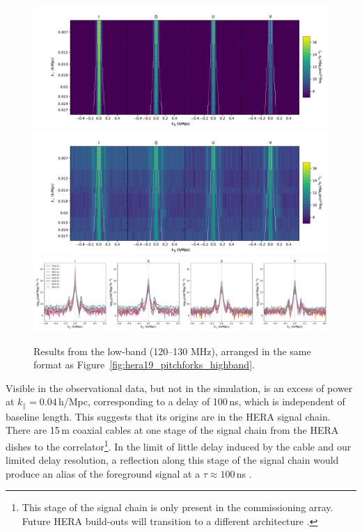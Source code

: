 \begin{figure}[h]
\centering
\includegraphics[scale=0.45]{chapters/eor_window_HERA/figures/timeavg_SIM_low.pdf}
\includegraphics[scale=0.45]{chapters/eor_window_HERA/figures/timeavg_low.pdf}
\includegraphics[scale=0.3]{chapters/eor_window_HERA/figures/timeavg_1d_low.pdf}
\caption[Power spectrum results from the low-band (120--130 MHz).]{Results from the low-band (120--130 MHz), arranged in the same format as Figure~\ref{fig:hera19_pitchforks_highband}.}
\label{fig:hera19_pitchforks_lowband}
\end{figure}

Visible in the observational data, but not in the simulation, is an excess of power at $k_{\parallel}=0.04$\,h/Mpc, corresponding to a delay of 100\,ns, which is independent of baseline length. This suggests that its origins are in the HERA signal chain. There are 15\,m coaxial cables at one stage of the signal chain from the HERA dishes to the correlator\footnote{This stage of the signal chain is only present in the commissioning array. Future HERA build-outs will transition to a different architecture \citep{deBoer.17}.}. In the limit of little delay induced by the cable and our limited delay resolution, a reflection along this stage of the signal chain would produce an alias of the foreground signal at a $\tau \approx 100$\,ns \citep{Beardsley.16, Ewall-Wice.EoX}.
\clearpage
